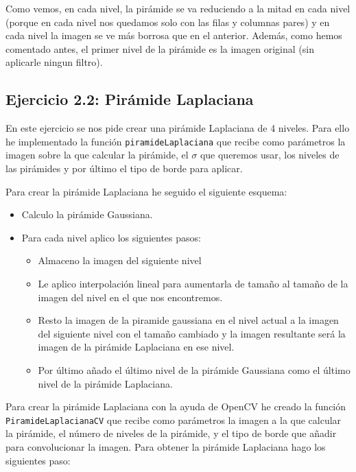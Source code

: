 \documentclass[12pt,spanish]{article}
\begin{document}
Como vemos, en cada nivel, la pirámide se va reduciendo a la mitad en cada nivel (porque en cada nivel nos quedamos solo con las filas y columnas pares) y en cada nivel la imagen se ve más borrosa que en el anterior. Además, como hemos comentado antes, el primer nivel de la pirámide es la imagen original (sin aplicarle ningun filtro). \\

\subsection{Ejercicio 2.2: Pirámide Laplaciana}
En este ejercicio se nos pide crear una pirámide Laplaciana de 4 niveles. Para ello he implementado la función \texttt{piramideLaplaciana} que recibe como parámetros la imagen sobre la que calcular la pirámide, el $\sigma$ que queremos usar, los niveles de las pirámides y por último el tipo de borde para aplicar.

Para crear la pirámide Laplaciana he seguido el siguiente esquema:
\begin{itemize}
	\item Calculo la pirámide Gaussiana.
	\item Para cada nivel aplico los siguientes pasos:
		\begin{itemize}
			\item Almaceno la imagen del siguiente nivel
			\item Le aplico interpolación lineal para aumentarla de tamaño al tamaño de la imagen del nivel en el que nos encontremos.
			\item Resto la imagen de la piramide gaussiana en el nivel actual a la imagen del siguiente nivel con el tamaño cambiado y la imagen resultante será la imagen de la pirámide Laplaciana en ese nivel.
			\item Por último añado el último nivel de la pirámide Gaussiana como el último nivel de la pirámide Laplaciana.
		\end{itemize}
\end{itemize}

Para crear la pirámide Laplaciana con la ayuda de OpenCV he creado la función \\
\texttt{PiramideLaplacianaCV} que recibe como parámetros la imagen a la que calcular la pirámide, el 
número de niveles de la pirámide, y el tipo de borde que añadir para convolucionar la imagen. Para obtener la pirámide Laplaciana hago los siguientes paso:
\end{document}
